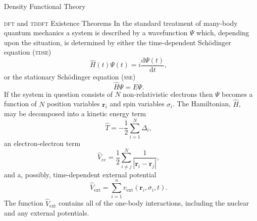 \documentclass[letterpaper, 10 pt]{report}
\begin{document}
\begin{chapter}{Density Functional Theory \label{chap:dft}}
\begin{section}{\textsc{dft} and \textsc{tddft} Existence Theorems \label{sec:dft}}
      In the standard treatment of many-body quantum mechanics a system is described by a wavefunction
      $\Psi$ which, depending upon the situation, is determined by either the time-dependent
      Sch\"{o}dinger equation (\textsc{tdse})
      \begin{equation} \label{eq:tdse}
         \hat{H}(t) \Psi(t) = i \frac{\mathrm{d} \Psi(t)}{\mathrm{d} t},
      \end{equation}
      or the stationary Sch\"{o}dinger equation (\textsc{sse})
      \begin{equation} \label{eq:sse}
         \hat{H} \Psi = E \Psi.
      \end{equation}
      If the system in question consists of $N$ non-relativistic electrons then $\Psi$ becomes a
      function of $N$ position variables $\mathbf{r}_i$ and spin variables $\sigma_i$. The Hamiltonian,
      $\hat{H}$, may be decomposed into a kinetic energy term
      \begin{equation} \label{eq:Top} %
         \hat{T} = -\frac{1}{2} \sum\limits^{N}_{i=1} \Delta_i,
      \end{equation}
      an electron-electron term
      \begin{equation} \label{eq:Vee} %
         \hat{V}_{ee} = \frac{1}{2} \sum\limits^{N}_{i \neq j}
                        \frac{1}{\left| \mathbf{r}_i - \mathbf{r}_j \right|},
      \end{equation}
      and a, possibly, time-dependent external potential
      \begin{equation} \label{eq:Vext}
         \hat{V}_\mathrm{ext} = \sum\limits^{n}_{i = 1} v_\mathrm{ext} (\mathbf{r}_i, \sigma_i, t).
      \end{equation}
      The function $\hat{V}_\mathrm{ext}$ contains all of the one-body interactions, including the
      nuclear and any external potentials.


\end{section}
\end{chapter}
\end{document}
